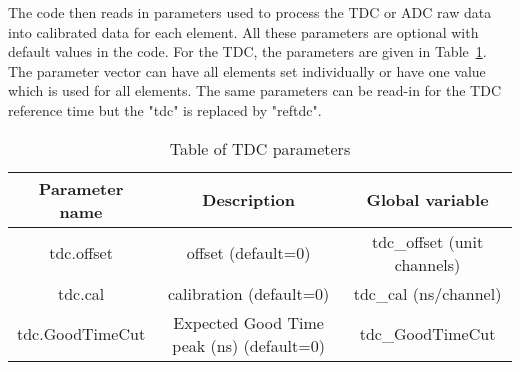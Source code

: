 \documentclass[11pt]{article}
\begin{document}
The code then reads in parameters used to process the TDC or ADC raw data into calibrated data
for each element. All these parameters are optional with default values in the code.
 For the TDC, the parameters are given in Table~\ref{tab:tdcparam}. The parameter
 vector can have all elements set individually or have one value which is used for all elements.
 The same parameters can be read-in for the TDC reference time but the "tdc" is replaced by "reftdc".
\begin{table}[h]
\begin{center}
	\begin{tabular}{|c|c|c|}
		\hline 
		Parameter name	& Description &  Global variable\\ 
		\hline
		tdc.offset &  offset (default=0)  & tdc\_offset (unit channels)\\
		\hline
       tdc.cal &  calibration (default=0) & tdc\_cal (ns/channel) \\
		\hline
       tdc.GoodTimeCut &  Expected Good Time peak (ns) (default=0) & tdc\_GoodTimeCut \\
\hline
	\end{tabular} 
\caption{Table of TDC parameters}\label{tab:tdcparam}
\end{center}
\end{table}
\end{document}
